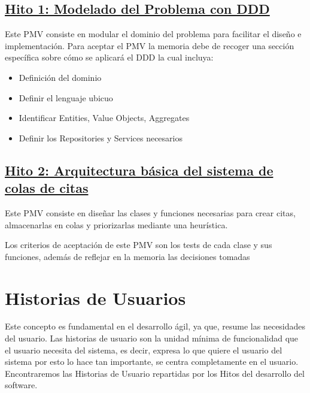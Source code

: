 \subsection*{\href{https://github.com/RubenDelgadoPareja/TFG-Triage-Inteligente-Consulta-Medica/milestone/7}{Hito 1: Modelado del Problema con DDD}}

Este PMV consiste en modular el dominio del problema para facilitar el diseño e implementación.
Para aceptar el PMV la memoria debe de recoger una sección específica sobre cómo se aplicará el DDD la cual incluya:

\begin{itemize}
    \item {Definición del dominio}
    \item {Definir el lenguaje ubicuo}
    \item {Identificar Entities, Value Objects, Aggregates}
    \item {Definir los Repositories y Services necesarios}
\end{itemize}


\subsection*{\href{https://github.com/RubenDelgadoPareja/TFG-Triage-Inteligente-Consulta-Medica/milestone/2}{Hito 2: Arquitectura básica del sistema de colas de citas}}

Este PMV consiste en diseñar las clases y funciones necesarias para crear citas, almacenarlas en colas y priorizarlas mediante una heurística.

Los criterios de aceptación de este PMV son los tests de cada clase y sus funciones, además de reflejar en la memoria las decisiones tomadas

\section{Historias de Usuarios}
Este concepto es fundamental en el desarrollo ágil, ya que, resume las necesidades del usuario.
Las historias de usuario son la unidad mínima de funcionalidad que el usuario necesita del sistema, es decir,
expresa lo que quiere el usuario del sistema por esto lo hace tan importante, se centra completamente en el
usuario. Encontraremos las Historias de Usuario repartidas por los Hitos del desarrollo del software.


